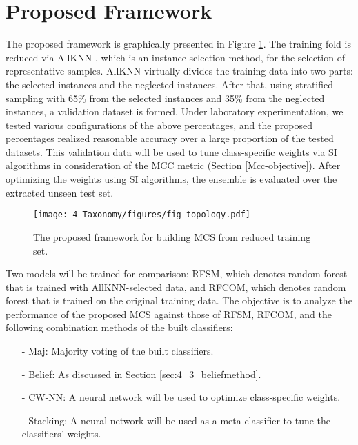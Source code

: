 %



\section{Proposed Framework}\label{sec:4_4_proposed}
The proposed framework is graphically presented in Figure \ref{ch4_topology}. The training fold is reduced via AllKNN \cite{tomek1976}, which is an instance selection method, for the selection of representative samples. AllKNN virtually divides the training data into two parts: the selected instances and the neglected instances. After that, using stratified sampling with 65\% from the selected instances and 35\% from the neglected instances, a validation dataset is formed. Under laboratory experimentation, we tested various configurations of the above percentages, and the proposed percentages realized reasonable accuracy over a large proportion of the tested datasets. This validation data will be used to tune class-specific weights via SI algorithms in consideration of the MCC metric (Section \ref{Mcc-objective}). After optimizing the weights using SI algorithms, the ensemble is evaluated over the extracted unseen test set.


\begin{figure}[!ht]
	\centering
	\texttt{[image: 4\_Taxonomy/figures/fig-topology.pdf]}
	\caption{The proposed framework for building MCS from reduced training set.}
	\label{ch4_topology}
\end{figure}





Two models will be trained for comparison: RFSM, which denotes random forest that is trained with AllKNN-selected data, and RFCOM, which denotes random forest that is trained on the original training data. The objective is to analyze the performance of the proposed MCS against those of RFSM, RFCOM, and the following combination methods of the built classifiers:


\begin{itemize}[nosep]
	\item[-] Maj: Majority voting of the built classifiers.
	\item[-] Belief: As discussed in Section \ref{sec:4_3_beliefmethod}.
	\item[-] CW-NN: A neural network will be used to optimize class-specific weights.
	\item[-] Stacking: A neural network will be used as a  meta-classifier to tune the classifiers' weights.
\end{itemize}


